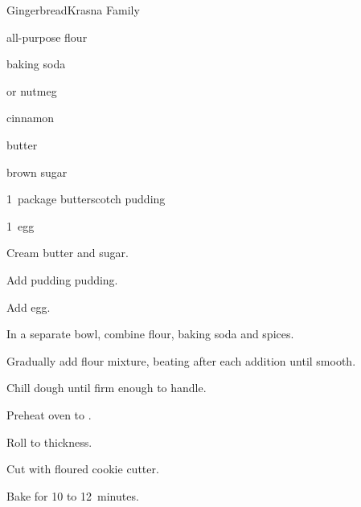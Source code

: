 \begin{recipe}{Gingerbread}{Krasna Family}{}

\begin{ingredients}
\item \C{1\half} all-purpose flour
\item {} baking soda
\item {}  or nutmeg
\item \tp{1\half} cinnamon
\item \C{\half} butter
\item \C{\half} brown sugar
\item 1~package butterscotch pudding
\item 1~egg
\end{ingredients}

\begin{directions}
\item Cream butter and sugar.
\item Add pudding pudding.
\item Add egg.
\item In a separate bowl, combine flour, baking soda and spices.
\item Gradually add flour mixture, beating after each addition until smooth.
\item Chill dough until firm enough to handle.
\item Preheat oven to .
\item Roll to  thickness.
\item Cut with floured cookie cutter.
\item Bake for 10 to 12~minutes.
\end{directions}
\end{recipe}
